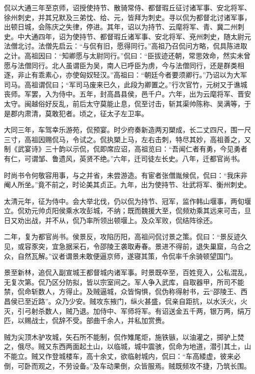 \documentclass[12pt,UTF8]{ctexbook}
\begin{document}
侃以大通三年至京师，诏授使持节、散骑常侍、都督瑕丘征讨诸军事、安北将军、徐州刺史，并其兄默及三弟忱、给、元，皆拜为刺史。寻以侃为都督北讨诸军事，出顿日城，会陈庆之失律，停进。其年，诏以为持节、云麾将军、青、冀二州刺史。中大通四年，诏为使持节、都督瑕丘诸军事、安北将军、兗州刺史，随太尉元法僧北讨。法僧先启云：“与侃有旧，愿得同行。”高祖乃召侃问方略，侃具陈进取之计。高祖因曰：“知卿愿与太尉同行。”侃曰：“臣拔迹还朝，常思效命，然实未曾愿与法僧同行。北人虽谓臣为吴，南人已呼臣为虏，今与法僧同行，还是群类相逐，非止有乖素心，亦使匈奴轻汉。”高祖曰：“朝廷今者要须卿行。”乃诏以为大军司马。高祖谓侃曰；“军司马废来已久，此段为卿置之。”行次官竹，元树又于谯城丧师。军罢，入为侍中。五年，封高昌县侯，邑千户。六年，出为云麾将军、晋安太守。闽越俗好反乱，前后太守莫能止息，侃至讨击，斩其渠帅陈称、吴满等，于是郡内肃清，莫敢犯者。顷之，征太子左卫率。

大同三年，车驾幸乐游苑，侃预宴。时少府奏新造两刃槊成，长二丈四尺，围一尺三寸，高祖因赐侃马，令试之。侃执槊上马，左右击刺，特尽其妙，高祖善之，又制《武宴诗》三十韵以示侃，侃即席应诏，高祖览曰：“吾闻仁者有勇，今见勇者有仁，可谓邹、鲁遗风，英贤不绝。”六年，迁司徒左长史。八年，迁都官尚书。

时尚书令何敬容用事，与之并省，未尝游造。有宦者张僧胤候侃，侃曰：“我床非阉人所坐。”竟不前之，时论美其贞正。九年，出为使持节、壮武将军、衡州刺史。

太清元年，征为侍中。会大举北伐，仍以侃为持节、冠军，监作韩山堰事，两旬堰立。侃劝元帅贞阳侯乘水攻彭城，不纳；既而魏援大至，侃频劝乘其远来可击，旦日又劝出战，并不从，侃乃率所领出顿堰上。及众军败，侃结阵徐还。

二年，复为都官尚书。侯景反，攻陷历阳，高祖问侃讨景之策。侃曰：“景反迹久见，或容豕突，宜急据采石，令邵陵王袭取寿春。景进不得前，退失巢窟，乌合之众，自然瓦解。”议者谓景未敢便逼京师，遂寝其策，令侃率千余骑顿望国门。

景至新林，追侃入副宣城王都督城内诸军事。时景既卒至，百姓竞入，公私混乱，无复次第。侃乃区分防拟，皆以宗室间之。军人争入武库，自取器甲，所司不能禁，侃命斩数人，方得止。及贼逼城，众皆恟惧，侃伪称得射书，云“邵陵王、西昌侯已至近路”。众乃少安。贼攻东掖门，纵火甚盛，侃亲自距抗，以水沃火，火灭，引弓射杀数人，贼乃退。加侍中、军师将军。有诏送金五千两，银万两，绢万匹，以赐战士，侃辞不受。部曲千余人，并私加赏赉。

贼为尖顶木驴攻城，矢石所不能制，侃作雉尾炬，施铁镞，以油灌之，掷驴上焚之，俄尽。贼又东西两面起土山，以临城，城中震骇，侃命为地道，潜引其土，山不能立。贼又作登城楼车，高十余丈，欲临射城内，侃曰：“车高緌虚，彼来必倒，可卧而观之，不劳设备。”及车动果倒，众皆服焉。贼既频攻不捷，乃筑长围。
\end{document}
